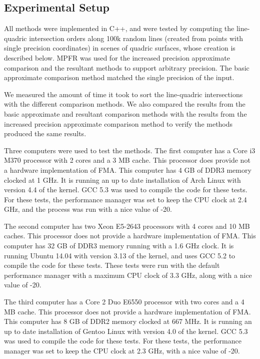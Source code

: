 \documentclass{cccg16}
\begin{document}
\subsection{Experimental Setup}
All methods were implemented in C++, and were tested by 
computing the line-quadric intersection orders along 100k random lines (created from points with single precision coordinates) in scenes of quadric surfaces, whose creation is described below.
MPFR\cite{mpfr} was used for the increased precision approximate
comparison and the resultant methods to support arbitrary 
precision.  The basic approximate comparison method matched the single
precision of the input.

We measured the amount of time it took to sort the line-quadric
intersections with the different comparison methods.  We also compared
the results from the basic approximate and resultant comparison
methods with the results from the increased precision approximate
comparison method to verify the methods produced the same results.

Three computers were used to test the methods.  The first computer has
a Core i3 M370 processor with 2 cores and a 3 MB cache.  This
processor does provide not a hardware implementation of FMA.  This
computer has 4 GB of DDR3 memory clocked at 1 GHz.  It is running an
up to date installation of Arch Linux with version 4.4 of the kernel.
GCC 5.3 was used to compile the code for these tests.  For these
tests, the performance manager was set to keep the CPU clock at 2.4
GHz, and the process was run with a nice value of -20.

The second computer has two Xeon E5-2643 processors with 4 cores and
10 MB caches.  This processor does not provide a hardware
implementation of FMA.  This computer has 32 GB of DDR3 memory running
with a 1.6 GHz clock.  It is running Ubuntu 14.04 with version 3.13 of
the kernel, and uses GCC 5.2 to compile the code for these tests.
These tests were run with the default performance manager with a
maximum CPU clock of 3.3 GHz, along with a nice value of -20.

The third computer has a Core 2 Duo E6550 processor with two cores and
a 4 MB cache.  This processor does not provide a hardware
implementation of FMA.  This computer has 8 GB of DDR2 memory clocked
at 667 MHz.  It is running an up to date installation of Gentoo Linux
with version 4.0 of the kernel.  GCC 5.3 was used to compile the code
for these tests.  For these tests, the performance manager was set to
keep the CPU clock at 2.3 GHz, with a nice value of -20.
\end{document}

